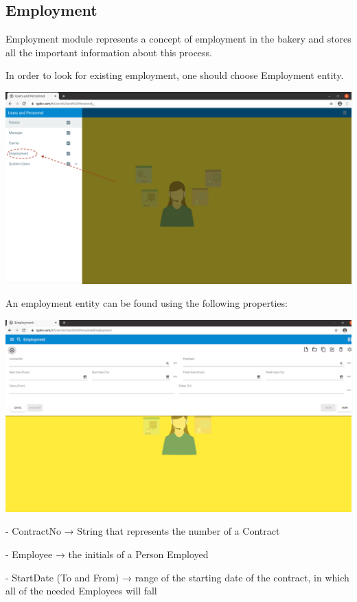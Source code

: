 \subsection{Employment}

Employment module represents a concept of employment in the bakery and stores all the important information about this process.

In order to look for existing employment, one should choose Employment entity.

\includegraphics[width=\textwidth]{sections/01-chapter/images/employment11.png}

An employment entity can be found using the following properties:

\includegraphics[width=\textwidth]{sections/01-chapter/images/employment2.png}

- ContractNo → String that represents the number of a Contract

- Employee → the initials of a Person Employed

- StartDate (To and From) → range of the starting date of the contract, in which all of the needed Employees will fall

